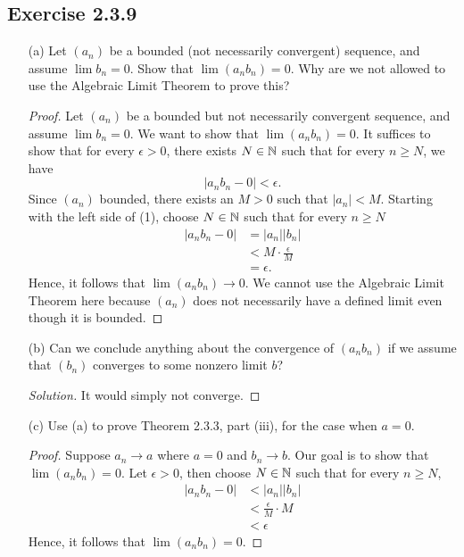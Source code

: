 \subsection{Exercise 2.3.9}
\begin{enumerate}
    \item[(a)] Let \( (a_n)\) be a bounded (not necessarily convergent) sequence, and assume \( \lim b_n  = 0\). Show that \( \lim (a_n b_n) = 0\). Why are we not allowed to use the Algebraic Limit Theorem to prove this? 
        \begin{proof}
        Let \( (a_n)\) be a bounded but not necessarily convergent sequence, and assume \( \lim b_n = 0 \). We want to show that \( \lim (a_n b_n ) = 0\). It suffices to show that for every \( \epsilon  > 0\), there exists \( N \in \mathbb{N}\) such that for every \( n \geq N \), we have 
        \[ | a_nb_n - 0 | < \epsilon. \tag{1}\]
        Since \( (a_n)\) bounded, there exists an \( M > 0\) such that \( | a_n  | < M \). Starting with the left side of (1), choose \( N \in \mathbb{N} \) such that for every \( n \geq N \) 
        \begin{align*}
            | a_n b_n - 0 |&= | a_n | | b_n |\\
                           &< M \cdot \frac{ \epsilon }{M} \tag{\(b_n \to 0\)} \\ 
                           &= \epsilon. 
        \end{align*}
        Hence, it follows that \( \lim (a_n b_n) \to 0\). We cannot use the Algebraic Limit Theorem here because \( (a_n)\) does not necessarily have a defined limit even though it is bounded.
        \end{proof}
    \item[(b)] Can we conclude anything about the convergence of \( (a_nb_n)\) if we assume that \( (b_n)\) converges to some nonzero limit \( b \)?
        \begin{proof}[Solution]
        It would simply not converge.
        \end{proof}
    \item[(c)] Use (a) to prove Theorem 2.3.3, part (iii), for the case when \( a = 0\). 
        \begin{proof}
            Suppose \( a_n \to a\) where \( a = 0\) and \( b_n \to b\). Our goal is to show that \( \lim(a_n b_n) = 0\). Let \( \epsilon > 0 \), then choose \( N \in \mathbb{N} \) such that for every \( n \geq N \),  
        \begin{align*}
         | a_nb_n - 0| &< | a_n | | b_n |   \\
                       &< \frac{ \epsilon }{ M } \cdot M  \tag{\( a_n \to 0, b_n \to b\)} \\ 
                       &< \epsilon   
        \end{align*}
        Hence, it follows that \( \lim (a_nb_n) = 0\).
        \end{proof}
\end{enumerate}


